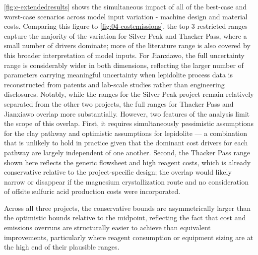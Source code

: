\documentclass{article}
\renewcommand\_{\textunderscore\allowbreak}
\begin{document}
\ref{fig:c-extendedresults} shows the simultaneous impact of all of the best-case and worst-case scenarios across model input variation - machine design and material costs. Comparing this figure to \ref{fig:04-costemissions}, the top 3 restricted ranges capture the majority of the variation for Silver Peak and Thacker Pass, where a small number of drivers dominate; more of the literature range is also covered by this broader interpretation of model inputs. For Jianxiawo, the full uncertainty range is considerably wider in both dimensions, reflecting the larger number of parameters carrying meaningful uncertainty when lepidolite process data is reconstructed from patents and lab-scale studies rather than engineering disclosures. Notably, while the ranges for the Silver Peak project remain relatively separated from the other two projects, the full ranges for Thacker Pass and Jianxiawo overlap more substantially. However, two features of the analysis limit the scope of this overlap. First, it requires simultaneously pessimistic assumptions for the clay pathway and optimistic assumptions for lepidolite --- a combination that is unlikely to hold in practice given that the dominant cost drivers for each pathway are largely independent of one another. Second, the Thacker Pass range shown here reflects the generic flowsheet and high reagent costs, which is already conservative relative to the project-specific design; the overlap would likely narrow or disappear if the magnesium crystallization route and no consideration of offsite sulfuric acid production costs were incorporated. 

Across all three projects, the conservative bounds are asymmetrically larger than the optimistic bounds relative to the midpoint, reflecting the fact that cost and emissions overruns are structurally easier to achieve than equivalent improvements, particularly where reagent consumption or equipment sizing are at the high end of their plausible ranges.
\end{document}
